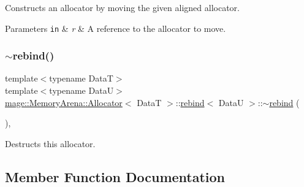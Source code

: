 Constructs an allocator by moving the given aligned allocator.


\begin{DoxyParams}[1]{Parameters}
\mbox{\tt in}  & {\em r} & A reference to the allocator to move. \\
\hline
\end{DoxyParams}
\hypertarget{structmage_1_1_memory_arena_1_1_allocator_1_1rebind_aa16db3ef40f7564d9079ee615239bda5}{}\label{structmage_1_1_memory_arena_1_1_allocator_1_1rebind_aa16db3ef40f7564d9079ee615239bda5} 
\subsubsection{\texorpdfstring{$\sim$rebind()}{~rebind()}}
{\footnotesize\ttfamily template$<$typename DataT$>$ \\
template$<$typename DataU$>$ \\
\hyperlink{structmage_1_1_memory_arena_1_1_allocator}{mage\+::\+Memory\+Arena\+::\+Allocator}$<$ DataT $>$\+::\hyperlink{structmage_1_1_memory_arena_1_1_allocator_1_1rebind}{rebind}$<$ DataU $>$\+::$\sim$\hyperlink{structmage_1_1_memory_arena_1_1_allocator_1_1rebind}{rebind} (\begin{DoxyParamCaption}{ }\end{DoxyParamCaption})\hspace{0.3cm}{\ttfamily [private]}, {\ttfamily [delete]}}

Destructs this allocator. 

\subsection{Member Function Documentation}
\hypertarget{structmage_1_1_memory_arena_1_1_allocator_1_1rebind_a2d7fe95797686c132cc76cf89d9bb259}{}\label{structmage_1_1_memory_arena_1_1_allocator_1_1rebind_a2d7fe95797686c132cc76cf89d9bb259} 
